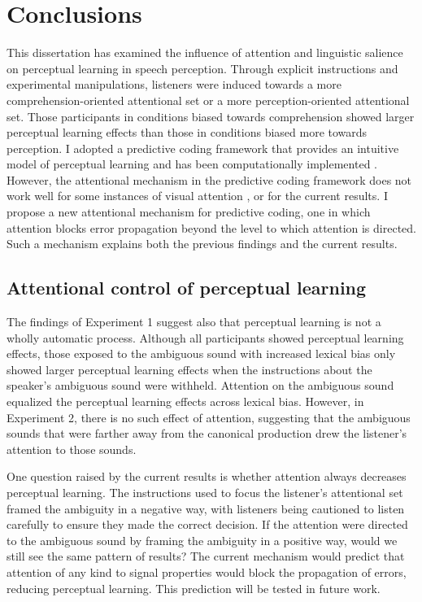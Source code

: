 
\chapter{Conclusions}
\label{chap:conclusion}

This dissertation has examined the influence of attention and linguistic salience on perceptual learning in speech perception.
Through explicit instructions and experimental manipulations, listeners were induced towards a more comprehension-oriented attentional set or a more perception-oriented attentional set.
Those participants in conditions biased towards comprehension showed larger perceptual learning effects than those in conditions biased more towards perception.
I adopted a predictive coding framework \citep{Clark2013} that provides an intuitive model of perceptual learning and has been computationally implemented \citep{Kleinschmidt2011}.
However, the attentional mechanism in the predictive coding framework does not work well for some instances of visual attention \citep{Block2013}, or for the current results.
I propose a new attentional mechanism for predictive coding, one in which attention blocks error propagation beyond the level to which attention is directed.  Such a mechanism explains both the previous findings and the current results.

\section{Attentional control of perceptual learning}

The findings of Experiment 1 suggest also that perceptual learning is not a wholly automatic process.  
Although all participants showed perceptual learning effects, those exposed to the ambiguous sound with increased lexical bias only showed larger perceptual learning effects when the instructions about the speaker's ambiguous sound were withheld.  
Attention on the ambiguous sound equalized the perceptual learning effects across lexical bias.
However, in Experiment 2, there is no such effect of attention, suggesting that the ambiguous sounds that were farther away from the canonical production drew the listener's attention to those sounds.

One question raised by the current results is whether attention always decreases perceptual learning.  
The instructions used to focus the listener's attentional set framed the ambiguity in a negative way, with listeners being cautioned to listen carefully to ensure they made the correct decision.  
If the attention were directed to the ambiguous sound by framing the ambiguity in a positive way, would we still see the same pattern of results?
The current mechanism would predict that attention of any kind to signal properties would block the propagation of errors, reducing perceptual learning.
This prediction will be tested in future work.

